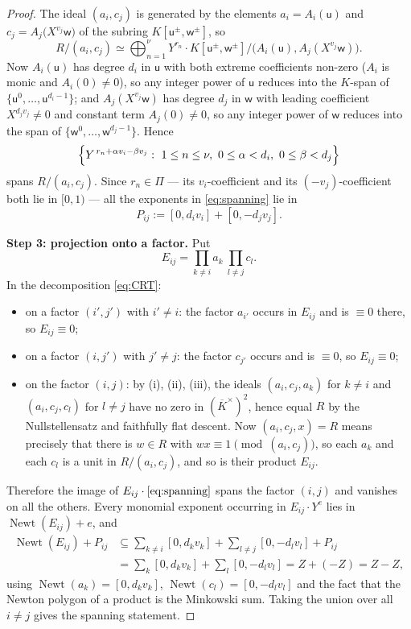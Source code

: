 \documentclass[11pt,reqno]{amsart}
\theoremstyle{plain}
\theoremstyle{definition}
\theoremstyle{remark}
\theoremstyle{plain}
\theoremstyle{remark}
\theoremstyle{definition}
\numberwithin{equation}{section}
\DeclareMathOperator{\Newt}{Newt}
\newcommand{\su}{\mathsf{u}}
\newcommand{\sw}{\mathsf{w}}
\begin{document}
\begin{proof}
The ideal $(a_i,c_j)$ is generated by the elements $a_i=A_i(\su)$ and
$c_j=A_j\bigl(X^{v_j}\sw\bigr)$ of the subring $K[\su^\pm,\sw^\pm]$, so
\[R/(a_i,c_j)\simeq\bigoplus_{n=1}^{\nu}Y^{r_n}\cdot
  K[\su^\pm,\sw^\pm]\big/\bigl(A_i(\su),A_j(X^{v_j}\sw)\bigr).\]
Now $A_i(\su)$ has degree $d_i$ in $\su$ with both extreme coefficients non-zero
($A_i$ is monic and $A_i(0)\ne0$), so any integer power of $\su$ reduces into
the $K$-span of $\{\su^0,\dots,\su^{d_i-1}\}$; and $A_j(X^{v_j}\sw)$ has degree
$d_j$ in $\sw$ with leading coefficient $X^{d_jv_j}\ne0$ and constant term
$A_j(0)\ne0$, so any integer power of $\sw$ reduces into the span of
$\{\sw^0,\dots,\sw^{d_j-1}\}$.  Hence
\begin{equation}
\Bigl\{Y^{\,r_n+\alpha v_i-\beta v_j}:\ 1\le n\le \nu,\ 0\le\alpha<d_i,\
0\le\beta<d_j\Bigr\} \label{eq:spanning}
\end{equation}
spans $R/(a_i,c_j)$.  Since $r_n\in\Pi$ — its $v_i$-coefficient and its
$(-v_j)$-coefficient both lie in $[0,1)$ — all the exponents in
\eqref{eq:spanning} lie in
\begin{equation}
P_{ij}:=[0,d_iv_i]+[0,-d_jv_j]. \label{eq:Pij}
\end{equation}

\textbf{Step 3: projection onto a factor.}  Put
\[E_{ij}=\prod_{k\ne i}a_k\ \prod_{l\ne j}c_l .\]
In the decomposition \eqref{eq:CRT}:
\begin{itemize}
\item on a factor $(i',j')$ with $i'\ne i$: the factor $a_{i'}$ occurs in
      $E_{ij}$ and is $\equiv0$ there, so $E_{ij}\equiv0$;
\item on a factor $(i,j')$ with $j'\ne j$: the factor $c_{j'}$ occurs and is
      $\equiv0$, so $E_{ij}\equiv0$;
\item on the factor $(i,j)$: by (i), (ii), (iii), the ideals $(a_i,c_j,a_k)$ for
      $k\ne i$ and $(a_i,c_j,c_l)$ for $l\ne j$ have no zero in
      $(\overline K^\times)^2$, hence equal $R$ by the Nullstellensatz and
      faithfully flat descent.  Now $(a_i,c_j,x)=R$ means precisely that there
      is $w\in R$ with $wx\equiv1\pmod{(a_i,c_j)}$, so each $a_k$ and each $c_l$
      is a unit in $R/(a_i,c_j)$, and so is their product $E_{ij}$.
\end{itemize}

Therefore the image of $E_{ij}\cdot\eqref{eq:spanning}$ spans the factor
$(i,j)$ and vanishes on all the others.  Every monomial exponent occurring in
$E_{ij}\cdot Y^{e}$ lies in $\Newt(E_{ij})+e$, and
\begin{align*}
\Newt(E_{ij})+P_{ij}
 &\subseteq\sum_{k\ne i}[0,d_kv_k]+\sum_{l\ne j}[0,-d_lv_l]+P_{ij}\\
 &=\sum_{k}[0,d_kv_k]+\sum_{l}[0,-d_lv_l]=Z+(-Z)=Z-Z,
\end{align*}
using $\Newt(a_k)=[0,d_kv_k]$, $\Newt(c_l)=[0,-d_lv_l]$ and the fact that the
Newton polygon of a product is the Minkowski sum.  Taking the union over all
$i\ne j$ gives the spanning statement.
\end{proof}
\end{document}
